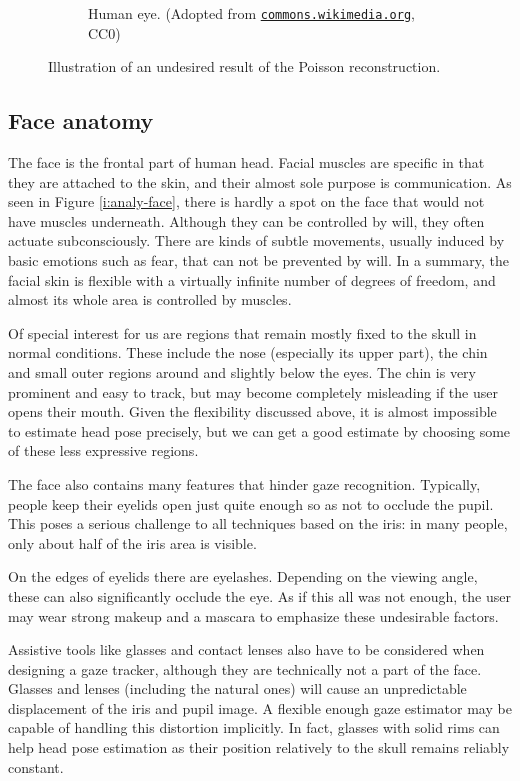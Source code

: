 \begin{figure}[ht]
\begin{subfigure}[b]{0.44\textwidth}
		\caption{Human eye. (Adopted from \href{https://commons.wikimedia.org/wiki/File:Schematic_diagram_of_the_human_eye_en.svg}{\tt commons.wikimedia.org}, CC0)}\label{i:analy-eye}
	\end{subfigure}
	\caption{Illustration of an undesired result of the Poisson reconstruction.}\label{i:analy-anatomy}
\end{figure}

\subsection{Face anatomy}
The face is the frontal part of human head.
Facial muscles are specific in that they are attached to the skin, and their almost sole purpose is communication.
As seen in Figure \ref{i:analy-face}, there is hardly a spot on the face that would not have muscles underneath.
Although they can be controlled by will, they often actuate subconsciously.
There are kinds of subtle movements, usually induced by basic emotions such as fear, that can not be prevented by will.
In a summary, the facial skin is flexible with a virtually infinite number of degrees of freedom, and almost its whole area is controlled by muscles.

Of special interest for us are regions that remain mostly fixed to the skull in normal conditions.
These include the nose (especially its upper part), the chin and small outer regions around and slightly below the eyes.
The chin is very prominent and easy to track, but may become completely misleading if the user opens their mouth.
Given the flexibility discussed above, it is almost impossible to estimate head pose precisely, but we can get a good estimate by choosing some of these less expressive regions.

The face also contains many features that hinder gaze recognition.
Typically, people keep their eyelids open just quite enough so as not to occlude the pupil.
This poses a serious challenge to all techniques based on the iris: in many people, only about half of the iris area is visible.

On the edges of eyelids there are eyelashes.
Depending on the viewing angle, these can also significantly occlude the eye.
As if this all was not enough, the user may wear strong makeup and a mascara to emphasize these undesirable factors.

Assistive tools like glasses and contact lenses also have to be considered when designing a gaze tracker, although they are technically not a part of the face.
Glasses and lenses (including the natural ones) will cause an unpredictable displacement of the iris and pupil image.
A flexible enough gaze estimator may be capable of handling this distortion implicitly.
In fact, glasses with solid rims can help head pose estimation as their position relatively to the skull remains reliably constant.

